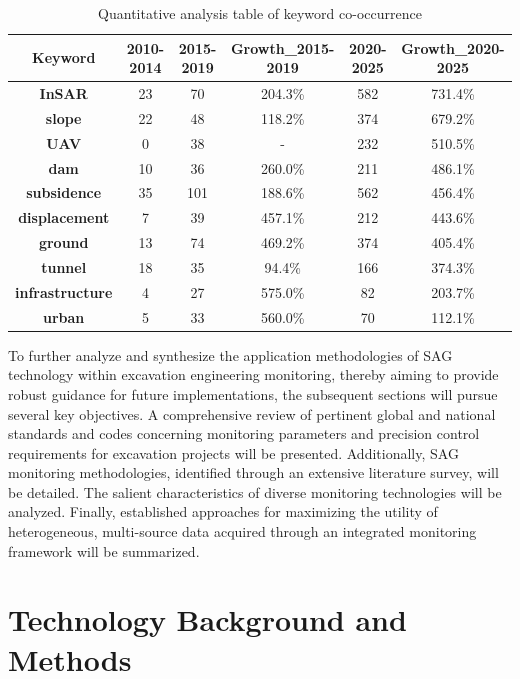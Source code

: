 \documentclass[preprint,11pt,authoryear,3p]{elsarticle}
\begin{document}
\begin{table}[htbp]
  \centering
  \caption{Quantitative analysis table of keyword co-occurrence}
    \begin{tabular}{cccccc}
    \toprule
    \textbf{Keyword} & \textbf{2010-2014} & \textbf{2015-2019} & \textbf{Growth\_2015-2019} & \textbf{2020-2025} & \textbf{Growth\_2020-2025} \\
    \midrule
    \textbf{InSAR} & 23    & 70    & 204.3\% & 582   & 731.4\% \\
    \textbf{slope} & 22    & 48    & 118.2\% & 374   & 679.2\% \\
    \textbf{UAV} & 0     & 38    & -     & 232   & 510.5\% \\
    \textbf{dam} & 10    & 36    & 260.0\% & 211   & 486.1\% \\
    \textbf{subsidence} & 35    & 101   & 188.6\% & 562   & 456.4\% \\
    \textbf{displacement} & 7     & 39    & 457.1\% & 212   & 443.6\% \\
    \textbf{ground} & 13    & 74    & 469.2\% & 374   & 405.4\% \\
    \textbf{tunnel} & 18    & 35    & 94.4\% & 166   & 374.3\% \\
    \textbf{infrastructure} & 4     & 27    & 575.0\% & 82    & 203.7\% \\
    \textbf{urban} & 5     & 33    & 560.0\% & 70    & 112.1\% \\
    \bottomrule
    \end{tabular}
  \label{tab:QuantitativeAnalTab}
\end{table}

To further analyze and synthesize the application methodologies of SAG technology within excavation engineering monitoring, thereby aiming to provide robust guidance for future implementations, the subsequent sections will pursue several key objectives. A comprehensive review of pertinent global and national standards and codes concerning monitoring parameters and precision control requirements for excavation projects will be presented. Additionally, SAG monitoring methodologies, identified through an extensive literature survey, will be detailed. The salient characteristics of diverse monitoring technologies will be analyzed. Finally, established approaches for maximizing the utility of heterogeneous, multi-source data acquired through an integrated monitoring framework will be summarized.

\section{Technology Background and Methods}
\end{document}
